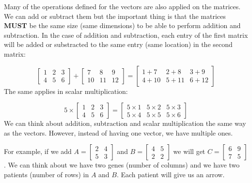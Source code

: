\documentclass[
]{book}
\theoremstyle{definition}
\theoremstyle{definition}
\theoremstyle{definition}
\theoremstyle{remark}
\begin{document}
Many of the operations defined for the vectors are also applied on the matrices. We can add or subtract them but the important thing is that the matrices \textbf{MUST} be the same size (same dimensions) to be able to perform addition and subtraction. In the case of addition and subtraction, each entry of the first matrix will be added or substracted to the same entry (same location) in the second matrix:

\[
\begin{bmatrix}
1 & 2 & 3\\
4 & 5 & 6
\end{bmatrix}+
\begin{bmatrix}
7 & 8 & 9\\
10 & 11 & 12
\end{bmatrix}=
\begin{bmatrix}
1+7 & 2+8 & 3+9\\
4+10 & 5+11 & 6+12
\end{bmatrix}
\]
The same applies in scalar multiplication:

\[
5 \times \begin{bmatrix}
1 & 2 & 3\\
4 & 5 & 6
\end{bmatrix}=
\begin{bmatrix}
5 \times 1 & 5 \times 2 & 5 \times 3\\
5 \times 4 & 5 \times 5 & 5 \times 6
\end{bmatrix}
\]
We can think about addition, subtraction and scalar multiplication the same way as the vectors. However, instead of having one vector, we have multiple ones.

For example, if we add \(A=\begin{bmatrix}2&4\\5&3\end{bmatrix}\) and \(B=\begin{bmatrix}4&5\\2&2\end{bmatrix}\) we will get \(C=\begin{bmatrix}6&9\\7&5\end{bmatrix}\). We can think about we have two genes (number of columns) and we have two patients (number of rows) in \(A\) and \(B\). Each patient will give us an arrow.
\end{document}
